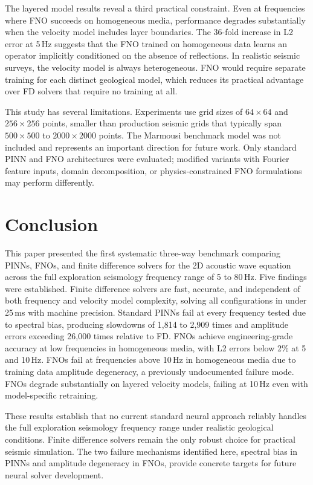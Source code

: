 \documentclass[12pt,a4paper]{article}
\begin{document}
The layered model results reveal a third practical constraint.
Even at frequencies where FNO succeeds on homogeneous media,
performance degrades substantially when the velocity model
includes layer boundaries. The 36-fold increase in L2 error at
5\,Hz suggests that the FNO trained on homogeneous data learns
an operator implicitly conditioned on the absence of reflections.
In realistic seismic surveys, the velocity model is always
heterogeneous. FNO would require separate training for each
distinct geological model, which reduces its practical advantage
over FD solvers that require no training at all.

This study has several limitations. Experiments use grid sizes
of $64 \times 64$ and $256 \times 256$ points, smaller than
production seismic grids that typically span $500 \times 500$ to
$2000 \times 2000$ points. The Marmousi benchmark model was not
included and represents an important direction for future work.
Only standard PINN and FNO architectures were evaluated; modified
variants with Fourier feature inputs, domain decomposition, or
physics-constrained FNO formulations may perform differently.

\section{Conclusion}
\label{sec:conclusion}

This paper presented the first systematic three-way benchmark
comparing PINNs, FNOs, and finite difference solvers for the 2D
acoustic wave equation across the full exploration seismology
frequency range of 5 to 80\,Hz. Five findings were established.
Finite difference solvers are fast, accurate, and independent of
both frequency and velocity model complexity, solving all
configurations in under 25\,ms with machine precision. Standard
PINNs fail at every frequency tested due to spectral bias,
producing slowdowns of 1,814 to 2,909 times and amplitude errors
exceeding 26,000 times relative to FD. FNOs achieve
engineering-grade accuracy at low frequencies in homogeneous
media, with L2 errors below 2\% at 5 and 10\,Hz. FNOs fail at
frequencies above 10\,Hz in homogeneous media due to training
data amplitude degeneracy, a previously undocumented failure
mode. FNOs degrade substantially on layered velocity models,
failing at 10\,Hz even with model-specific retraining.

These results establish that no current standard neural approach
reliably handles the full exploration seismology frequency range
under realistic geological conditions. Finite difference solvers
remain the only robust choice for practical seismic simulation.
The two failure mechanisms identified here, spectral bias in
PINNs and amplitude degeneracy in FNOs, provide concrete targets
for future neural solver development.
\end{document}
